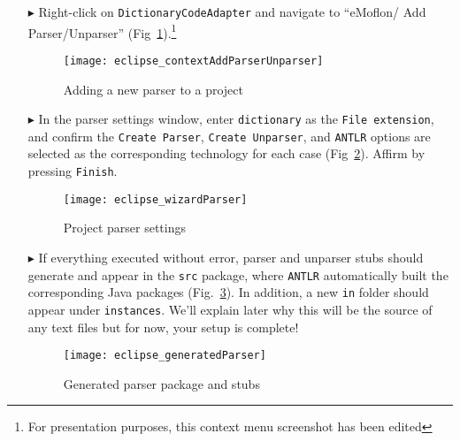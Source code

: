 \begin{itemize}

\item[$\blacktriangleright$] Right-click on \texttt{DictionaryCodeAdapter} and navigate to ``eMoflon/ Add Parser/Unparser''
(Fig~\ref{eclipse:contextParser}).\footnote{For presentation purposes, this context menu screenshot has been edited}

\vspace{0.5cm}

\begin{figure}[htpb]
\begin{center}
  \texttt{[image: eclipse\_contextAddParserUnparser]}
  \caption{Adding a new parser to a project}
  \label{eclipse:contextParser}
\end{center}
\end{figure}


\item[$\blacktriangleright$] In the parser settings window, enter \texttt{dictionary} as the \texttt{File extension}, and confirm the \texttt{Create Parser},
\texttt{Create Unparser}, and \texttt{ANTLR} options are selected as the corresponding technology for each case (Fig~\ref{eclipse:wizardParser}). Affirm by
pressing \texttt{Finish}.

\begin{figure}[htpb]
\begin{center}
  \texttt{[image: eclipse\_wizardParser]}
  \caption{Project parser settings}
  \label{eclipse:wizardParser}
\end{center}
\end{figure}


\item[$\blacktriangleright$] If everything executed without error, parser and unparser stubs should generate and appear in the \texttt{src}
package, where \texttt{ANTLR} automatically built the corresponding Java packages (Fig.~\ref{eclipse:generatedParser}). In addition, a new
\texttt{in} folder should appear under \texttt{instances}. We'll explain later why this will be the source of any text files but for now, your setup
is complete!

\begin{figure}[htpb]
\begin{center}
  \texttt{[image: eclipse\_generatedParser]}
  \caption{Generated parser package and stubs}
  \label{eclipse:generatedParser}
\end{center}
\end{figure}

\end{itemize}
